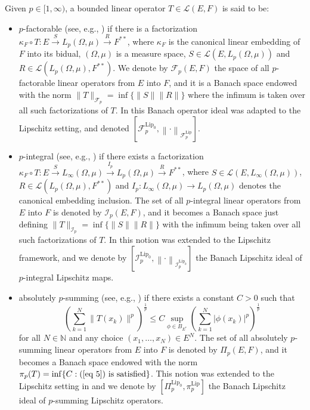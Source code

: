 \documentclass[12pt]{amsart}
\def\F{\mathcal{F}}
\def\I{\mathcal{I}}
\def\L{\mathcal{L}}
\def\N{\mathbb{N}}
\def\Lip{\mathrm{Lip}_0}
\def\Lipnorm{\mathrm{Lip}}
\begin{document}
Given $p\in[1,\infty)$, a bounded linear operator $T \in \L(E,F)$ is said to be:
\begin{itemize}
	\item $p$-factorable (see, e.g., \cite[19.4]{Pie-80}) if there is a factorization $\kappa_F \circ T: E \xrightarrow{S} L_p(\Omega,\mu) \xrightarrow{R} F^{**}$, where $\kappa_F$ is the canonical linear embedding of $F$ into its bidual, $(\Omega,\mu)$ is a measure space, $S\in\L(E,L_p(\Omega,\mu))$ and $R\in\L(L_p(\Omega,\mu),F^{**})$. We denote by $\F_p(E,F)$ the space of all $p$-factorable linear operators from $E$ into $F$, and it is a Banach space endowed with the norm $\|T\|_{\F_p} = \inf\{\|S\|\|R\|\}$ where the infimum is taken over all such factorizations of $T$. In \cite{AchTia-24} this Banach operator ideal was adapted to the Lipschitz setting, and denoted $[\F_p^{\Lip},\left\|\cdot\right\|_{\F_p^{\Lipnorm}}]$.
	\item $p$-integral (see, e.g., \cite[19.2]{Pie-80}) if there exists a factorization $\kappa_F\circ T: E \xrightarrow{S} L_\infty(\Omega,\mu)\xrightarrow{I_p} L_p (\Omega,\mu) \xrightarrow{R} F^{**}$, where $S\in\L(E,L_\infty(\Omega,\mu))$, $R\in\L(L_p(\Omega,\mu),F^{**})$ and $I_p: L_\infty(\Omega,\mu) \to L_p(\Omega,\mu)$ denotes the canonical embedding inclusion. The set of all $p$-integral linear operators from $E$ into $F$ is denoted by $\I_p(E,F)$, and it becomes a Banach space just defining $\|T\|_{\I_p} =\inf\{\|S\|\|R\|\}$ with the infimum being taken over all such factorizations of $T$. In \cite[Section 2.3]{AchRueSanYah-16} this notion was extended to the Lipschitz framework, and we denote by $[\I_p^{\Lip},\left\|\cdot\right\|_{\I_p^{\Lip}}]$ the Banach Lipschitz ideal of $p$-integral Lipschitz maps.
	\item absolutely $p$-summing (see, e.g., \cite[17.3]{Pie-80}) if there exists a constant $C>0$ such that
	\begin{equation}\label{eq 5}
	\left(\sum_{k=1}^{N} \|T(x_k)\|^p \right)^{\frac{1}{p}} \leq C \sup_{\phi\in B_{E^*}} \left(\sum_{k=1}^{N} |\phi(x_k)|^p \right)^{\frac{1}{p}}
	\end{equation}
	for all $N\in\N$ and any choice $(x_1,\ldots,x_N)\in E^N$. The set of all absolutely $p$-summing linear operators from $E$ into $F$ is denoted by $\Pi_p(E,F)$, and it becomes a Banach space endowed with the norm $\pi_p(T) = \inf\{C: (\ref{eq 5}) \text{ is satisfied} \}$. This notion was extended to the Lipschitz setting in \cite{FarJoh-09} and we denote by $[\Pi_p^{\Lip},\pi_p^{\Lipnorm}]$ the Banach Lipschitz ideal of $p$-summing Lipschitz operators.
\end{itemize}
\end{document}
